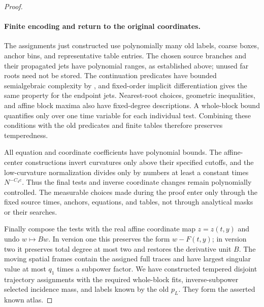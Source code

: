 \begin{proof}
\paragraph{Finite encoding and return to the original coordinates.}
The assignments just constructed use polynomially many old labels,
coarse boxes, anchor bins, and representative table entries.  The
chosen source branches and their propagated jets have polynomial
ranges, as established above; unused far roots need not be stored.
The continuation predicates have bounded semialgebraic complexity
by , and fixed-order implicit
differentiation gives the same property for the endpoint jets.
Nearest-root choices, geometric inequalities, and affine block
maxima also have fixed-degree descriptions.  A whole-block bound
quantifies only over one time variable for each individual test.
Combining these conditions with the old predicates and finite
tables therefore preserves temperedness.

All equation and coordinate coefficients have polynomial bounds.
The affine-center constructions invert curvatures only above their
specified cutoffs, and the low-curvature normalization divides only
by numbers at least a constant times \(N^{-C_4e}\).
Thus the final tests and inverse coordinate changes remain
polynomially controlled.  The measurable choices made during the
proof enter only through the fixed source times, anchors, equations,
and tables, not through analytical masks or their searches.

Finally compose the tests with the real affine coordinate map
\(z=z(t,y)\) and undo \(w\mapsto Bw\).  In version one this
preserves the form \(w-F(t,y)\); in version two it preserves total
degree at most two and restores the derivative unit \(B\).
The moving spatial frames contain the assigned full traces and
have largest singular value at most \(q_1\) times a subpower
factor.  We have constructed tempered disjoint trajectory
assignments with the required whole-block fits, inverse-subpower
selected incidence mass, and labels known by the old \(p_L\).
They form the asserted known atlas.
\end{proof}
